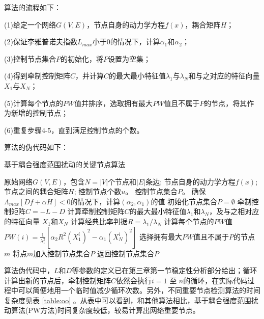 算法的流程如下：

(1)给定一个网络$ G(V,E) $，节点自身的动力学方程$ f(x) $，耦合矩阵$ H $；

(2)保证李雅普诺夫指数$ L_{max} $小于0的情况下，计算$ \alpha_1 $和$ \alpha_2 $；

(3)控制节点集合$ P $的初始化，将$ P $设置为空集；

(4)得到牵制控制矩阵$ C $，并计算$ C $的最大最小特征值$ \lambda_1 $与$ \lambda_N $和与之对应的特征向量$ X_1 $与$ X_N $；

(5)计算每个节点的$ PW $值并排序，选取拥有最大$ PW $值且不属于$ P $的节点，将其作为新增的控制节点；

(6)重复步骤4-5，直到满足控制节点的个数。

算法的伪代码如下：
\label{algorithm}
\renewcommand{\algorithmicrequire}{\textbf{输入:}} 
\renewcommand{\algorithmicensure}{\textbf{输出:}}
\begin{algorithm}[htp]
	\caption{基于耦合强度范围扰动的关键节点算法}
	\label{PWcode}
	\begin{algorithmic}[1]
		\REQUIRE
		原始网络$ G(V,E) $，包含$ N=|V| $个节点和$ |E| $条边;
		节点自身的动力学方程$ f(x) $;
		节点之间的耦合矩阵$ H $;
		控制节点个数$ u $。
		\ENSURE
		控制节点集合$ P $。
		\STATE 确保$ \Lambda_{max}[Df+\alpha H]<0 $的情况下，计算$ (\alpha_2, \alpha_1) $的值
		\STATE 初始化节点集合$P=\emptyset $
		\REPEAT
		\STATE 牵制控制矩阵$ C=-L-D $
		\STATE 计算牵制控制矩阵$ C $的最大最小特征值$ \lambda_1 $和$ \lambda_N $，及与之相对应的特征向量 $ X_1 $和$ X_N $
		\STATE 计算经典比率判据$ R = {\lambda_1}/{\lambda_N} $%
		\STATE  计算每个节点的$ PW $值$ PW(i) =  \frac{1}{\lambda_1^2}[\alpha_2R^2(X_1^i)^2-\alpha_1(X_N^i)^2] $
		\ENDFOR
		\STATE 选择拥有最大$ PW $值且不属于$ P $的节点$ m $
		\STATE 将点$ m $加入控制节点集合$ P $
		\STATE 返回控制节点集合$P$
	\end{algorithmic}
\end{algorithm}

算法伪代码中，$ L $和$ D $等参数的定义已在第三章第一节稳定性分析部分给出；循环计算出新的节点后，牵制控制矩阵$ C $依然会执行$ i=1 $ 至 $ n $的循环，在实际代码过程中可以简便地用一个临时值减少循环次数。另外，不同重要节点检测算法的时间复杂度见表 \ref{table:oo} 。从表中可以看到，和其他算法相比，基于耦合强度范围扰动算法(PW方法)时间复杂度较低，较易计算出网络重要节点。

